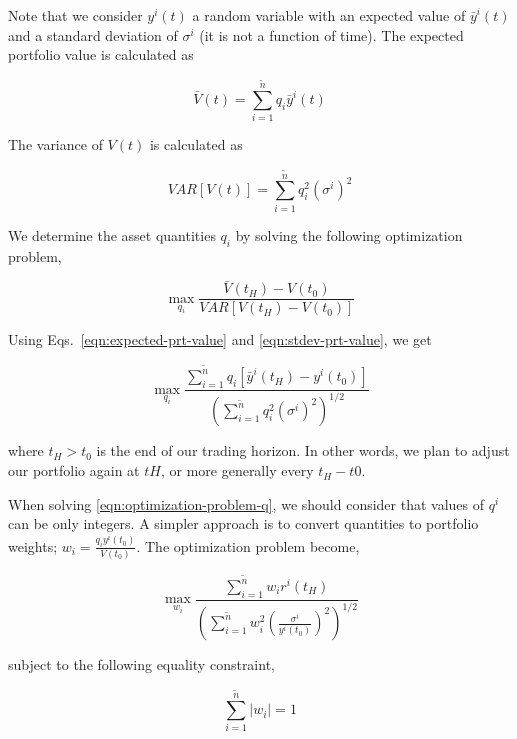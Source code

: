 \documentclass{article}
\begin{document}
Note that we consider $y^{i}(t)$ a random variable with an expected
value of $\bar{y}^{i}(t)$ and a standard deviation of $\sigma^{i}$ (it
is not a function of time). The expected portfolio value is calculated
as

\begin{equation}\label{eqn:expected-prt-value}
\bar{V}(t) = \sum_{i=1}^{\tilde{n}} q_{i} \bar{y}^{i}(t)
\end{equation}

The variance of $V(t)$ is calculated as

\begin{equation}\label{eqn:stdev-prt-value}
VAR[V(t)] = \sum_{i=1}^{\tilde{n}} q_{i}^{2} (\sigma^{i})^{2}
\end{equation}

We determine the asset quantities $q_{i}$ by solving the following
optimization problem,

\begin{equation}\label{eqn:optimization-problem-V}
\max_{q_{i}} \frac{\bar{V}(t_{H})-V(t_{0})}{VAR[V(t_{H})-V(t_{0})]}
\end{equation}

Using Eqs.~\ref{eqn:expected-prt-value} and \ref{eqn:stdev-prt-value},
we get

\begin{equation}\label{eqn:optimization-problem-q}
\max_{q_{i}} \frac{\sum_{i=1}^{\tilde{n}}
  q_{i} [\bar{y}^{i}(t_{H})-y^{i}(t_{0})]}{(\sum_{i=1}^{\tilde{n}}
    q_{i}^{2} (\sigma^{i})^{2})^{1/2}}
\end{equation}

where $t_{H} > t_{0}$ is the end of our trading horizon. In other
words, we plan to adjust our portfolio again at $t{H}$, or more
generally every $t_{H}-t{0}$.

When solving \ref{eqn:optimization-problem-q}, we should consider that
values of $q^{i}$ can be only integers. A simpler approach is to
convert quantities to portfolio weights; $w_{i} = \frac{q_{i}
  y^{i}(t_{0})}{V(t_{0})}$. The optimization problem become,

\begin{equation}\label{eqn:optimization-problem-w}
\max_{w_{i}} \frac{\sum_{i=1}^{\tilde{n}}
  w_{i} r^{i}(t_{H})}{(\sum_{i=1}^{\tilde{n}}
  w_{i}^{2} (\frac{\sigma^{i}}{y^{i}(t_{0})})^{2})^{1/2}}
\end{equation}

subject to the following equality constraint,

\begin{equation}\label{eqn:sum-constraint}
\sum_{i=1}^{\tilde{n}} |w_{i}| = 1
\end{equation}
\end{document}
